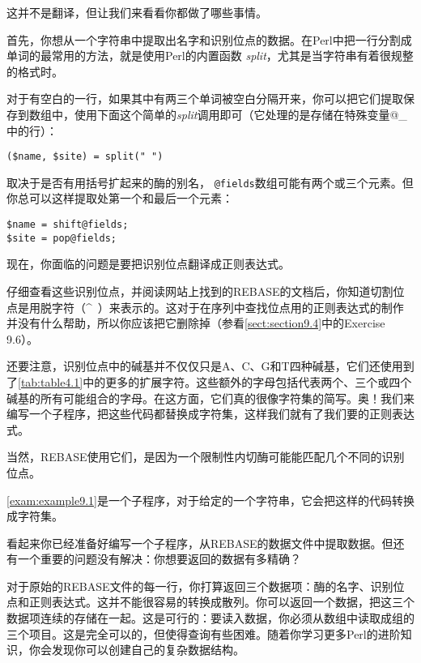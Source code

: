 这并不是翻译，但让我们来看看你都做了哪些事情。

首先，你想从一个字符串中提取出名字和识别位点的数据。在Perl中把一行分割成单词的最常用的方法，就是使用Perl的内置函数 \textit{split}，尤其是当字符串有着很规整的格式时。

对于有空白的一行，如果其中有两三个单词被空白分隔开来，你可以把它们提取保存到数组中，使用下面这个简单的\textit{split}调用即可（它处理的是存储在特殊变量@\_中的行）：

\begin{lstlisting}
($name, $site) = split(" ")
\end{lstlisting}

取决于是否有用括号扩起来的酶的别名， \verb|@fields|数组可能有两个或三个元素。但你总可以这样提取处第一个和最后一个元素：

\begin{lstlisting}
$name = shift@fields;
$site = pop@fields;
\end{lstlisting}

现在，你面临的问题是要把识别位点翻译成正则表达式。

仔细查看这些识别位点，并阅读网站上找到的REBASE的文档后，你知道切割位点是用脱字符（\^~）来表示的。这对于在序列中查找位点用的正则表达式的制作并没有什么帮助，所以你应该把它删除掉（参看\autoref{sect:section9.4}中的Exercise 9.6）。

还要注意，识别位点中的碱基并不仅仅只是A、C、G和T四种碱基，它们还使用到了\autoref{tab:table4.1}中的更多的扩展字符。这些额外的字母包括代表两个、三个或四个碱基的所有可能组合的字母。在这方面，它们真的很像字符集的简写。奥！我们来编写一个子程序，把这些代码都替换成字符集，这样我们就有了我们要的正则表达式。

当然，REBASE使用它们，是因为一个限制性内切酶可能能匹配几个不同的识别位点。

\autoref{exam:example9.1}是一个子程序，对于给定的一个字符串，它会把这样的代码转换成字符集。



看起来你已经准备好编写一个子程序，从REBASE的数据文件中提取数据。但还有一个重要的问题没有解决：你想要返回的数据有多精确？

对于原始的REBASE文件的每一行，你打算返回三个数据项：酶的名字、识别位点和正则表达式。这并不能很容易的转换成散列。你可以返回一个数据，把这三个数据项连续的存储在一起。这是可行的：要读入数据，你必须从数组中读取成组的三个项目。这是完全可以的，但使得查询有些困难。随着你学习更多Perl的进阶知识，你会发现你可以创建自己的复杂数据结构。

